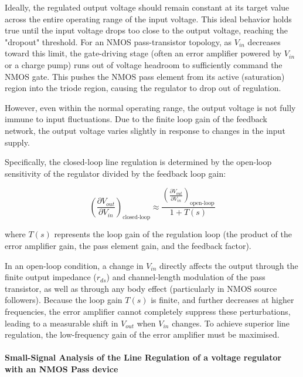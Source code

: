 \documentclass[
]{article}
\begin{document}
Ideally, the regulated output voltage should remain constant at its
target value across the entire operating range of the input voltage.
This ideal behavior holds true until the input voltage drops too close
to the output voltage, reaching the "dropout" threshold. For an NMOS
pass-transistor topology, as \(V_{in}\) decreases toward this limit, the
gate-driving stage (often an error amplifier powered by \(V_{in}\) or a
charge pump) runs out of voltage headroom to sufficiently command the
NMOS gate. This pushes the NMOS pass element from its active
(saturation) region into the triode region, causing the regulator to
drop out of regulation.

However, even within the normal operating range, the output voltage is
not fully immune to input fluctuations. Due to the finite loop gain of
the feedback network, the output voltage varies slightly in response to
changes in the input supply.

Specifically, the closed-loop line regulation is determined by the
open-loop sensitivity of the regulator divided by the feedback loop
gain:

\[\left(\frac{\partial V_{out}}{\partial V_{in}}\right)_{\text{closed-loop}} \approx \frac{\left( \frac{\partial V_{out}}{\partial V_{in}} \right)_{\text{open-loop}}}{1 + T(s)}\]

where \(T(s)\) represents the loop gain of the regulation loop (the
product of the error amplifier gain, the pass element gain, and the
feedback factor).

In an open-loop condition, a change in \(V_{in}\) directly affects the
output through the finite output impedance (\(r_{ds}\)) and
channel-length modulation of the pass transistor, as well as through any
body effect (particularly in NMOS source followers). Because the loop
gain \(T(s)\) is finite, and further decreases at higher frequencies,
the error amplifier cannot completely suppress these perturbations,
leading to a measurable shift in \(V_{out}\) when \(V_{in}\) changes. To
achieve superior line regulation, the low-frequency gain of the error
amplifier must be maximised.

\paragraph{Small-Signal Analysis of the Line Regulation of a voltage
regulator with an NMOS Pass
device}\label{_small_signal_analysis_of_the_line_regulation_of_a_voltage_regulator_with_an_nmos_pass_device}
\end{document}
